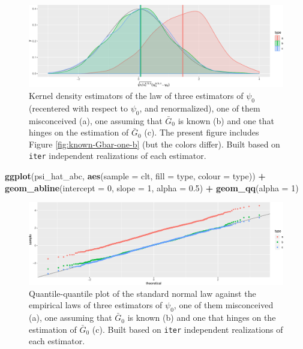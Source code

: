 \documentclass[]{article}
\newenvironment{Shaded}{\begin{snugshade}}{\end{snugshade}}
\newcommand{\DataTypeTok}[1]{\textcolor[rgb]{0.13,0.29,0.53}{#1}}
\newcommand{\DecValTok}[1]{\textcolor[rgb]{0.00,0.00,0.81}{#1}}
\newcommand{\FloatTok}[1]{\textcolor[rgb]{0.00,0.00,0.81}{#1}}
\newcommand{\KeywordTok}[1]{\textcolor[rgb]{0.13,0.29,0.53}{\textbf{#1}}}
\newcommand{\NormalTok}[1]{#1}
\newcommand{\OperatorTok}[1]{\textcolor[rgb]{0.81,0.36,0.00}{\textbf{#1}}}
\newcommand{\StringTok}[1]{\textcolor[rgb]{0.31,0.60,0.02}{#1}}
\newcommand{\Gbar}{\bar{G}}
\theoremstyle{definition}
\theoremstyle{definition}
\theoremstyle{definition}
\theoremstyle{remark}
\begin{document}
\begin{figure}
\centering
\includegraphics{img/unknown-Gbar-three-1.pdf}
\caption{\label{fig:unknown-Gbar-three}Kernel density estimators of the law
of three estimators of \(\psi_{0}\) (recentered with respect to
\(\psi_{0}\), and renormalized), one of them misconceived (a), one
assuming that \(\Gbar_{0}\) is known (b) and one that hinges on the
estimation of \(\Gbar_{0}\) (c). The present figure includes Figure
\ref{fig:known-Gbar-one-b} (but the colors differ). Built based on
\texttt{iter} independent realizations of each estimator.}
\end{figure}

\begin{Shaded}
\begin{Highlighting}[]
\KeywordTok{ggplot}\NormalTok{(psi_hat_abc, }\KeywordTok{aes}\NormalTok{(}\DataTypeTok{sample =}\NormalTok{ clt, }\DataTypeTok{fill =}\NormalTok{ type, }\DataTypeTok{colour =}\NormalTok{ type)) }\OperatorTok{+}
\StringTok{  }\KeywordTok{geom_abline}\NormalTok{(}\DataTypeTok{intercept =} \DecValTok{0}\NormalTok{, }\DataTypeTok{slope =} \DecValTok{1}\NormalTok{, }\DataTypeTok{alpha =} \FloatTok{0.5}\NormalTok{) }\OperatorTok{+}
\StringTok{  }\KeywordTok{geom_qq}\NormalTok{(}\DataTypeTok{alpha =} \DecValTok{1}\NormalTok{)}
\end{Highlighting}
\end{Shaded}

\begin{figure}
\centering
\includegraphics{img/unknown-Gbar-four-1.pdf}
\caption{\label{fig:unknown-Gbar-four}Quantile-quantile plot of the standard
normal law against the empirical laws of three estimators of
\(\psi_{0}\), one of them misconceived (a), one assuming that
\(\Gbar_{0}\) is known (b) and one that hinges on the estimation of
\(\Gbar_{0}\) (c). Built based on \texttt{iter} independent realizations
of each estimator.}
\end{figure}
\end{document}
